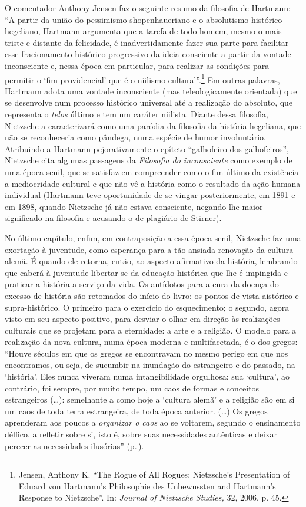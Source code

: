 O comentador Anthony Jensen faz o seguinte resumo da filosofia de
Hartmann: ``A partir da união do pessimismo shopenhaueriano e o
absolutismo histórico hegeliano, Hartmann argumenta que a tarefa de todo
homem, mesmo o mais triste e distante da felicidade, é inadvertidamente
fazer sua parte para facilitar esse fracionamento histórico progressivo
da ideia consciente a partir da vontade inconsciente e, nessa época em
particular, para realizar as condições para permitir o `fim
providencial' que é o niilismo cultural''.\footnote{Jensen, Anthony K.
  ``The Rogue of All Rogues: Nietzsche's Presentation of Eduard von
  Hartmann's Philosophie des Unbewussten and Hartmann's Response
  to Nietzsche''. In: \emph{Journal of Nietzsche Studies,} 32, 2006, p.
  45.} Em outras palavras, Hartmann adota uma vontade inconsciente (mas
teleologicamente orientada) que se desenvolve num processo histórico
universal até a realização do absoluto, que representa o \emph{telos}
último e tem um caráter niilista. Diante dessa filosofia, Nietzsche a
caracterizará como uma paródia da filosofia da história hegeliana, que
não se reconheceria como pândega, numa espécie de humor involuntário.
Atribuindo a Hartmann pejorativamente o epíteto ``galhofeiro dos
galhofeiros'', Nietzsche cita algumas passagens da \emph{Filosofia do
inconsciente} como exemplo de uma época senil, que se satisfaz em
compreender como o fim último da existência a mediocridade cultural e
que não vê a história como o resultado da ação humana individual 
(Hartmann teve oportunidade de se vingar posteriormente, em 1891 e em
1898, quando Nietzsche já não estava consciente, negando-lhe maior
significado na filosofia e acusando-o de plagiário de Stirner).

No último capítulo, enfim, em contraposição a essa época senil,
Nietzsche faz uma exortação à juventude, como esperança para a tão
ansiada renovação da cultura alemã. É quando ele retorna, então, ao
aspecto afirmativo da história, lembrando que caberá à juventude
libertar-se da educação histórica que lhe é impingida e praticar a
história a serviço da vida. Os antídotos para a cura da doença do
excesso de história são retomados do início do livro: os pontos de vista
aistórico e supra-histórico. O primeiro para o exercício do
esquecimento; o segundo, agora visto em seu aspecto positivo, para
desviar o olhar em direção às realizações culturais que se projetam para
a eternidade: a arte e a religião. O modelo para a realização da nova
cultura, numa época moderna e multifacetada, é o dos gregos: ``Houve
séculos em que os gregos se encontravam no mesmo perigo em que nos
encontramos, ou seja, de sucumbir na inundação do estrangeiro e do
passado, na `história'. Eles nunca viveram numa intangibilidade
orgulhosa: sua `cultura', ao contrário, foi sempre, por muito tempo, um
caos de formas e conceitos estrangeiros (\ldots{}): semelhante a como hoje a
`cultura alemã' e a religião são em si um caos de toda terra
estrangeira, de toda época anterior. (\ldots{}) Os gregos aprenderam aos
poucos a \emph{organizar o caos} ao se voltarem, segundo o ensinamento
délfico, a refletir sobre si, isto é, sobre suas necessidades autênticas
e deixar perecer as necessidades ilusórias'' (p.\,\pageref{necessidadesilusorias}).

